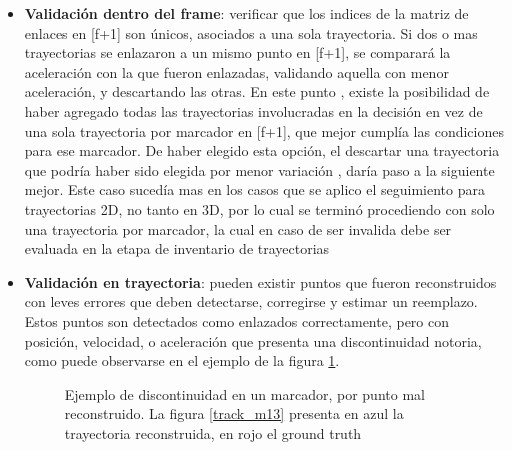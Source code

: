 \begin{itemize}
\item \textbf{Validación dentro del frame}: verificar que los indices de la matriz de enlaces en [f+1] son únicos, asociados a una sola trayectoria. Si dos o mas trayectorias se enlazaron a un mismo punto en [f+1], se comparará la aceleración con la que fueron enlazadas, validando aquella con menor aceleración, y descartando las otras. En este punto , existe la posibilidad de haber agregado todas las trayectorias involucradas en la decisión en vez de una sola trayectoria por marcador en [f+1], que mejor cumplía las condiciones para ese marcador. De haber elegido esta opción, el descartar una trayectoria que podría haber sido elegida por menor variación , daría paso a la siguiente mejor. Este caso sucedía mas en los casos que se aplico el seguimiento para trayectorias 2D, no tanto en 3D, por lo cual se terminó procediendo con solo una trayectoria por marcador, la cual en caso de ser invalida debe ser evaluada en la etapa de inventario de trayectorias  
\item \textbf{Validación en trayectoria}: pueden existir puntos que fueron reconstruidos con leves errores que deben detectarse, corregirse y estimar un reemplazo. Estos puntos son detectados como enlazados correctamente, pero con posición, velocidad, o aceleración que presenta una discontinuidad notoria, como puede observarse en el ejemplo de la figura \ref{discontinuidad_tracking}.

\begin{figure}[H]
 \centering
 \caption{Ejemplo de discontinuidad en un marcador, por punto mal reconstruido. La figura \ref{track_m13} presenta en azul la trayectoria reconstruida, en rojo el ground truth}
 \label{discontinuidad_tracking}
\end{figure}


\end{itemize}
